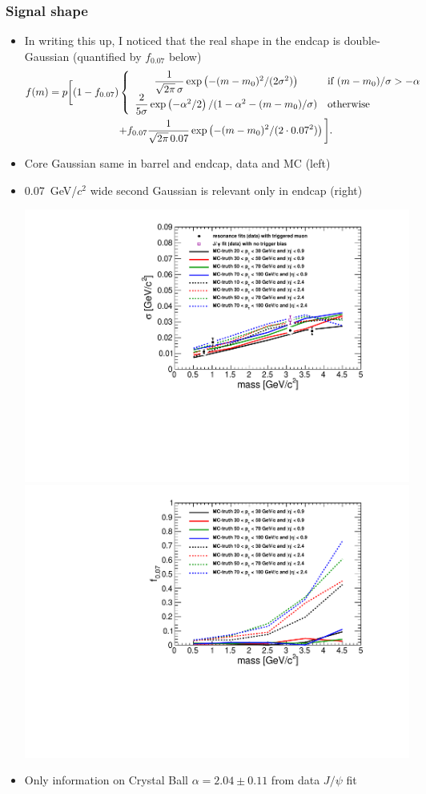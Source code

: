 \documentclass[compress]{beamer}
\begin{document}
\begin{frame}
\frametitle{Signal shape}
\begin{itemize}
\item In writing this up, I noticed that the real shape in the endcap is double-Gaussian (quantified by $f_{0.07}$ below)
{\tiny
\begin{multline}
f(m) = p \bigg[ (1 - f_{0.07}) 
\left\{ \begin{array}{c l} \dfrac{1}{\sqrt{2\pi}\, \sigma} \exp\left(-(m - m_0)^2 / (2 \sigma^2)\right) & \mbox{if $(m - m_0)/\sigma > -\alpha$} \\
\dfrac{2}{5 \sigma} \exp\left(-\alpha^2/2\right)/(1 - \alpha^2 - (m-m_0)/\sigma) & \mbox{otherwise} \end{array} \right. \\
+ f_{0.07} \frac{1}{\sqrt{2\pi}\, 0.07} \exp\left(-(m - m_0)^2 / (2 \cdot 0.07^2)\right)\bigg]\mbox{.}
\end{multline}}

\vspace{-0.5 cm}
\item Core Gaussian same in barrel and endcap, data and MC (left)

\item 0.07~GeV/$c^2$ wide second Gaussian is relevant only in endcap (right)

\includegraphics[width=0.5\linewidth]{resolution.pdf}
\includegraphics[width=0.5\linewidth]{resolution_f007.pdf}

\item Only information on Crystal Ball $\alpha = 2.04 \pm 0.11$ from data $J/\psi$ fit
\end{itemize}
\end{frame}
\end{document}
